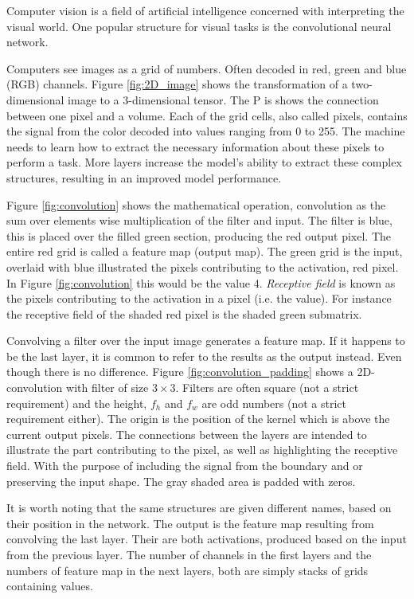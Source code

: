 \documentclass{article}
\begin{document}
Computer vision is a field of artificial intelligence concerned with interpreting the visual world. One popular structure for visual tasks is the convolutional neural network. %

Computers see images as a grid of numbers. Often decoded in red, green and blue (RGB) channels. Figure \ref{fig:2D_image} shows the transformation of a two-dimensional image to a 3-dimensional tensor. The P is shows the connection between one pixel and a volume. Each of the grid cells, also called pixels, contains the signal from the color decoded into values ranging from 0 to 255. The machine needs to learn how to extract the necessary information about these pixels to perform a task. More layers increase the model's ability to extract these complex structures, resulting in an improved model performance. 

Figure \ref{fig:convolution} shows the mathematical operation, convolution as the sum over elements wise multiplication of the filter and input. The filter is blue, this is placed over the filled green section, producing the red output pixel. The entire red grid is called a feature map (output map). The green grid is the input, overlaid with blue illustrated the pixels contributing to the activation, red pixel. In Figure \ref{fig:convolution} this would be the value 4. \textit{Receptive field} is known as the pixels contributing to the activation in a pixel (i.e. the value). For instance the receptive field of the shaded red pixel is the shaded green submatrix.


Convolving a filter over the input image generates a feature map. If it happens to be the last layer, it is common to refer to the results as the output instead. Even though there is no difference. Figure \ref{fig:convolution_padding} shows a 2D-convolution with filter of size $3\times 3$. Filters are often square (not a strict requirement) and the height, $f_h$ and $f_w$ are odd numbers (not a strict requirement either). The origin is the position of the kernel which is above the current output pixels. The connections between the layers are intended to illustrate the part contributing to the pixel, as well as highlighting the receptive field. With the purpose of including the signal from the boundary and or preserving the input shape. The gray shaded area is padded with zeros. 

It is worth noting that the same structures are given different names, based on their position in the network. The output is the feature map resulting from convolving the last layer. Their are both activations, produced based on the input from the previous layer. The number of channels in the first layers and the numbers of feature map in the next layers, both are simply stacks of grids containing values.
\end{document}
